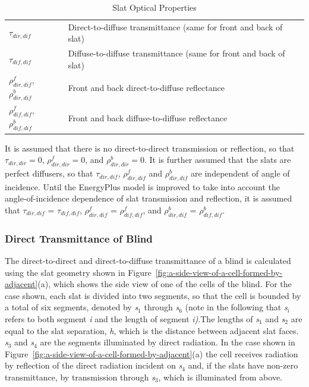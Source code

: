 \begin{longtable}[c]{p{1.5in}p{2.5in}}
\caption{Slat Optical Properties \label{table:slat-optical-properties}} \tabularnewline
\toprule
\({\tau_{dir,dif}}\) & Direct-to-diffuse transmittance (same for front and back of slat) \tabularnewline
\({\tau_{dif,dif}}\) & Diffuse-to-diffuse transmittance (same for front and back of slat) \tabularnewline
\(\rho_{dir,dif}^f\), \(\rho_{dir,dif}^b\) & Front and back direct-to-diffuse reflectance \tabularnewline
\(\rho_{dif,dif}^f\), \(\rho_{dif,dif}^b\) & Front and back diffuse-to-diffuse reflectance \tabularnewline
\bottomrule
\end{longtable}

It is assumed that there is no direct-to-direct transmission or reflection, so that \({\tau_{dir,dir}} = 0\), \(\rho_{dir,dir}^f = 0\), and \(\rho_{dir,dir}^b = 0\). It is further assumed that the slats are perfect diffusers, so that \({\tau_{dir,dif}}\), \(\rho_{dir,dif}^f\) and \(\rho_{dir,dif}^b\) are independent of angle of incidence. Until the EnergyPlus model is improved to take into account the angle-of-incidence dependence of slat transmission and reflection, it is assumed that \({\tau_{dir,dif}}\) = \({\tau_{dif,dif}}\), \(\rho_{dir,dif}^f\) = \(\rho_{dif,dif}^f\), and \(\rho_{dir,dif}^b\) = \(\rho_{dif,dif}^b\).

\subsubsection{Direct Transmittance of Blind}\label{direct-transmittance-of-blind}

The direct-to-direct and direct-to-diffuse transmittance of a blind is calculated using the slat geometry shown in Figure~\ref{fig:a-side-view-of-a-cell-formed-by-adjacent}(a), which shows the side view of one of the cells of the blind. For the case shown, each slat is divided into two segments, so that the cell is bounded by a total of six segments, denoted by \emph{s\(_{1}\)} through \emph{s\(_{6}\)} (note in the following that \emph{s\(_{i}\)} refers to both segment \emph{i} and the length of segment \emph{i)}.The lengths of \emph{s\(_{1}\)} and \emph{s\(_{2}\)} are equal to the slat separation, \emph{h}, which is the distance between adjacent slat faces. \emph{s\(_{3}\)} and \emph{s\(_{4}\)} are the segments illuminated by direct radiation. In the case shown in Figure~\ref{fig:a-side-view-of-a-cell-formed-by-adjacent}(a) the cell receives radiation by reflection of the direct radiation incident on \emph{s\(_{4}\)} and, if the slats have non-zero transmittance, by transmission through \emph{s\(_{3}\)}, which is illuminated from above.

